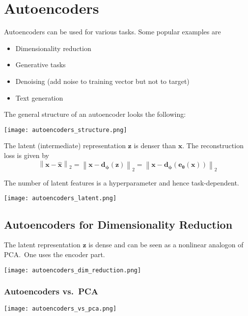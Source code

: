\section{Autoencoders}
Autoencoders can be used for various tasks. Some popular examples are
\begin{itemize}
    \item Dimensionality reduction
    \item Generative tasks
    \item Denoising (add noise to training vector but not to target)
    \item Text generation
\end{itemize}
The general structure of an autoencoder looks the following:
\begin{center}
    \texttt{[image: autoencoders\_structure.png]}
\end{center}
The latent (intermediate) representation $\mathbf{z}$ is denser than $\mathbf{x}$. The reconstruction loss is given by
\begin{equation*}
    \left\|\mathbf{x}-\hat{\mathbf{x}}\right\|_2=\left\|\mathbf{x}-\mathbf{d_\phi}(\mathbf{z})\right\|_2=\left\|\mathbf{x}-\mathbf{d_\phi}(\mathbf{e_\theta}(\mathbf{x}))\right\|_2
\end{equation*}

\newpar{}

The number of latent features is a hyperparameter and hence task-dependent.
\begin{center}
    \texttt{[image: autoencoders\_latent.png]}
\end{center}

\subsection{Autoencoders for Dimensionality Reduction}
The latent representation $\mathbf{z}$ is dense and can be seen as a nonlinear analogon of PCA.\ One uses the encoder part.
\begin{center}
    \texttt{[image: autoencoders\_dim\_reduction.png]}
\end{center}

\subsubsection{Autoencoders vs.\ PCA}
\begin{center}
    \texttt{[image: autoencoders\_vs\_pca.png]}
\end{center}

